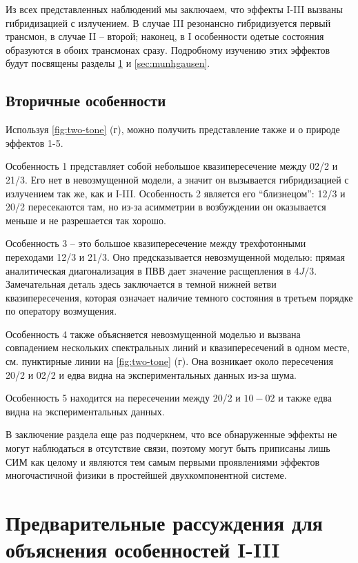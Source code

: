 \documentclass[14pt, a4paper]{extreport}
\numberwithin{equation}{section}
\begin{document}
Из всех представленных наблюдений мы заключаем, что эффекты I-III вызваны гибридизацией с излучением. В случае III резонансно гибридизуется первый трансмон, в случае II -- второй; наконец, в I особенности одетые состояния образуются в обоих трансмонах сразу. Подробному изучению этих эффектов будут посвящены разделы \ref{sec:theory} и \ref{sec:munhgausen}. 

\subsection{Вторичные особенности}

Используя \autoref{fig:two-tone} (г), можно получить представление также и о природе эффектов 1-5.

Особенность 1 представляет собой небольшое квазипересечение между 02/2 и 21/3. Его нет в невозмущенной модели, а значит он вызывается гибридизацией с излучением так же, как и I-III. Особенность 2 является его ``близнецом'': 12/3 и 20/2 пересекаются там, но из-за асимметрии в возбуждении он оказывается меньше и не разрешается так хорошо.

Особенность 3 -- это большое квазипересечение между трехфотонными переходами 12/3 и 21/3. Оно предсказывается невозмущенной моделью: прямая аналитическая диагонализация в ПВВ дает значение расщепления в $4J/3$. Замечательная деталь здесь заключается в темной нижней ветви квазипересечения, которая означает наличие темного состояния в третьем порядке по оператору возмущения.

Особенность 4 также объясняется невозмущенной моделью и вызвана совпадением нескольких спектральных линий и квазипересечений в одном месте, см. пунктирные линии на \autoref{fig:two-tone} (г). Она возникает около пересечения 20/2 и 02/2 и едва видна на экспериментальных данных из-за шума. 

Особенность 5 находится на пересечении между 20/2 и $10-02$ и также едва видна на экспериментальных данных.

В заключение раздела еще раз подчеркнем, что все обнаруженные эффекты не могут наблюдаться в отсутствие связи, поэтому могут быть приписаны лишь СИМ как целому и являются тем самым первыми проявлениями эффектов многочастичной физики в простейшей двухкомпонентной системе.

\section{Предварительные рассуждения для объяснения особенностей I-III}\label{sec:theory}
\end{document}
